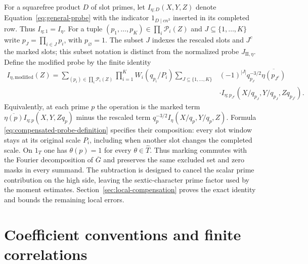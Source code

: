 For a squarefree product $D$ of slot primes, let
$I_{\eta;D}(X,Y,Z)$ denote Equation~\eqref{eq:general-probe} with
the indicator $1_{D\mid cn^3}$ inserted in its completed row.
Thus $I_{\eta;1}=I_\eta$.  For a tuple
$(p_1,\ldots,p_K)\in\prod_i\mathcal P_i(Z)$ and
$J\subseteq\{1,\ldots,K\}$ write $p_J=\prod_{i\in J}p_i$, with
$p_\varnothing=1$.  The subset $J$ indexes the rescaled slots and $J^c$
the marked slots; this subset notation is distinct from the normalized
probe $J_{\mathrm{II},\eta}$.  Define the modified probe by the finite identity
\begin{equation}\label{eq:compensated-probe-definition}
\begin{split}
 I_{\eta,\mathrm{modified}}(Z)
 =\sum_{(p_i)\in\prod_i\mathcal P_i(Z)}\prod_{i=1}^K W_i(q_{p_i}/P_i)
 \sum_{J\subseteq\{1,\ldots,K\}}&(-1)^{|J|}q_{p_J}^{-3/2}
          \overline{\eta(p_{J^c})}\\
 &\cdot I_{\eta;p_{J^c}}
       (X/q_{p_J},Y/q_{p_J},Zq_{p_{J^c}}).
\end{split}
\end{equation}
Equivalently, at each prime $p$ the operation is the marked term
$\overline{\eta(p)}I_{\eta;p}(X,Y,Zq_p)$ minus the rescaled term
$q_p^{-3/2}I_\eta(X/q_p,Y/q_p,Z)$.  Formula
\eqref{eq:compensated-probe-definition} specifies their composition:
every slot window stays at its original scale $P_i$, including when
another slot changes the completed scale.  On $1_T$ one has
$\theta(p)=1$ for every $\theta\in\widehat T$.  Thus marking commutes
with the Fourier decomposition of $\overline G$ and preserves the
same excluded set and zero masks in every summand.
The subtraction is designed to cancel the scalar prime contribution on
the high side, leaving the sextic-character prime factor used by the moment
estimates. Section~\ref{sec:local-compensation} proves the exact identity
and bounds the remaining local errors.

\section{Coefficient conventions and finite correlations}
\label{sec:additional-arithmetic}

